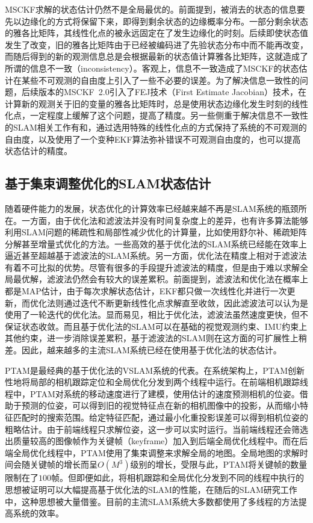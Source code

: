 MSCKF求解的状态估计仍然不是全局最优的。前面提到，被消去的状态的信息要先以边缘化的方式将保留下来，即得到剩余状态的边缘概率分布。一部分剩余状态的雅各比矩阵，其线性化点的被永远固定在了发生边缘化的时刻。后续即使状态值发生了改变，旧的雅各比矩阵由于已经被编码进了先验状态分布中而不能再改变，而随后得到的新的观测信息总是会根据最新的状态值计算雅各比矩阵，这就造成了所谓的信息不一致（inconsistency）。客观上，信息不一致造成了MSCKF的状态估计在某些不可观测的自由度上引入了一些不必要的误差。为了解决信息一致性的问题，后续版本的MSCKF~2.0\citep{li2012improving}引入了FEJ技术（First Estimate Jacobian）技术\citep{huang2008analysis}，在计算新的观测关于旧的变量的雅各比矩阵时，总是使用状态边缘化发生时刻的线性化点，一定程度上缓解了这个问题，提高了精度。另一些侧重于解决信息不一致性的SLAM相关工作有和，通过选用特殊的线性化点的方式保持了系统的不可观测的自由度，以及使用了一个变种EKF算法弥补错误不可观测自由度的，也可以提高状态估计的精度。

\subsection{基于集束调整优化的SLAM状态估计}

随着硬件能力的发展，状态优化的计算效率已经越来越不再是SLAM系统的瓶颈所在。一方面，由于优化法和滤波法并没有时间复杂度上的差异，也有许多算法能够利用SLAM问题的稀疏性和局部性减少优化的计算量，比如使用舒尔补、稀疏矩阵分解甚至增量式优化的方法。一些高效的基于优化法的SLAM系统已经能在效率上逼近甚至超越基于滤波法的SLAM系统。另一方面，优化法在精度上相对于滤波法有着不可比拟的优势。尽管有很多的手段提升滤波法的精度，但是由于难以求解全局最优解，滤波法仍然会有较大的误差累积。前面提到，滤波法和优化法在概率上都是MAP估计，由于每次求解状态估计，EKF都只做一次线性化并进行一次更新，而优化法则通过迭代不断更新线性化点求解直至收敛，因此滤波法可以认为是使用了一轮迭代的优化法。显而易见，相比于优化法，滤波法虽然速度更快，但不保证状态收敛。而且基于优化法的SLAM可以在基础的视觉观测约束、IMU约束上其他约束，进一步消除误差累积，基于滤波法的SLAM则在这方面的可扩展性上稍差。因此，越来越多的主流SLAM系统已经在使用基于优化法的状态估计。

PTAM\citep{klein2007parallel}是最经典的基于优化法的VSLAM系统的代表。在系统架构上，PTAM创新性地将局部的相机跟踪定位和全局优化分发到两个线程中运行。在前端相机跟踪线程中，PTAM对系统的移动速度进行了建模，使用估计的速度预测相机的位姿。借助于预测的位姿，可以得到旧的视觉特征点在新的相机图像中的投影，从而缩小特征匹配时的搜索范围。给定特征匹配，通过最小化重投影误差可以得到相机位姿的粗略估计。由于前端线程只求解位姿，这一步可以实时运行。当前端线程还会筛选出质量较高的图像帧作为关键帧（keyframe）加入到后端全局优化线程中。而在后端全局优化线程中，PTAM使用了集束调整来求解全局的地图。全局地图的求解时间会随关键帧的增长而呈$O(M^3)$级别的增长，受限与此，PTAM将关键帧的数量限制在了$100$帧。但即便如此，将相机跟踪和全局优化分发到不同的线程中执行的思想被证明可以大幅提高基于优化法的SLAM的性能，在随后的SLAM研究工作中，这种思想被大量借鉴。目前的主流SLAM系统大多数都使用了多线程的方法提高系统的效率。

